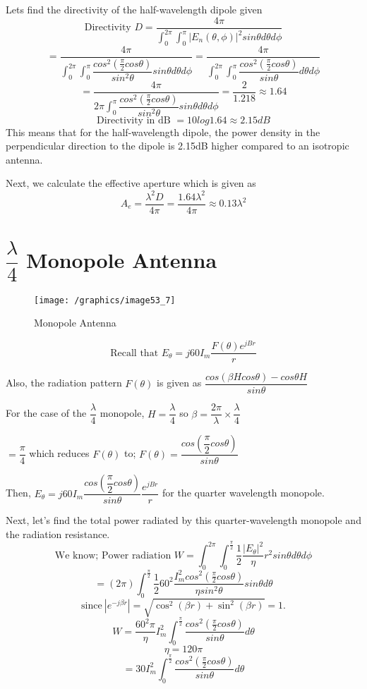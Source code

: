 Lets find the directivity of the half-wavelength dipole given 
\[ \text{Directivity }D = \dfrac{4\pi}{\int_{0}^{2\pi}\int_{0}^{\pi}|E_n(\theta ,\phi)|^2sin\theta d\theta d\phi} \]
\[ = \dfrac{4\pi}{\int_{0}^{2\pi}\int_{0}^{\pi}\dfrac{cos^2(\frac{\pi}{2}cos\theta)}{sin^2\theta}sin\theta d\theta d\phi} = \dfrac{4\pi}{\int_{0}^{2\pi}\int_{0}^{\pi}\dfrac{cos^2(\frac{\pi}{2}cos\theta)}{sin\theta} d\theta d\phi} \]
\[ = \dfrac{4\pi}{2\pi\int_{0}^{\pi}\dfrac{cos^2(\frac{\pi}{2}cos\theta)}{sin^2\theta}sin\theta d\theta d\phi} = \dfrac{2}{1.218} \approx 1.64 \]
\[ \text{Directivity in dB } = 10log1.64 \approx 2.15dB \]
This means that for the half-wavelength dipole, the power density in the perpendicular direction to the dipole is 2.15dB higher compared to an isotropic antenna.

Next, we calculate the effective aperture which is given as 
\[A_e = \dfrac{\lambda^2 D}{4\pi} = \dfrac{1.64\lambda^2}{4\pi} \approx 0.13\lambda^2 \]

\section{$\dfrac{\lambda}{4}$ Monopole Antenna}
\begin{figure}[h]
\centering
\texttt{[image: /graphics/image53\_7]}
\caption{Monopole Antenna}
\label{fig:fig7}
\end{figure}
\begin{equation*}
\text{Recall that }E_\theta = j60I_m \frac{F(\theta)e^{jBr}}{r}
\end{equation*}
\begin{center}
Also, the radiation pattern $F(\theta)$ is given as $\dfrac{cos(\beta H cos\theta) - cos\theta H}{sin \theta}$

For the case of the $\dfrac{\lambda}{4}$ monopole, $H = \dfrac{\lambda}{4}$ so $\beta = \dfrac{2\pi}{\lambda} \times \dfrac{\lambda}{4}$

$ = \dfrac{\pi}{4} $ which reduces $F(\theta)$ to; $F(\theta) = \dfrac{cos (\dfrac{\pi}{2} cos\theta)}{sin\theta}$

Then, $E_\theta = j60I_m \dfrac{cos (\dfrac{\pi}{2} cos\theta)}{sin\theta} \dfrac{e^{jBr}}{r}$ for the quarter wavelength monopole.
\end{center}
Next, let's find the total power radiated by this quarter-wavelength monopole and the radiation resistance. 
\[ \text{We know; Power radiation } W = \int_0^{2\pi}\int_{0}^{\frac{\pi}{2}} \frac{1}{2}\frac{|E_\theta|^2}{\eta}r^2sin\theta d\theta d\phi \]
\[ = (2\pi)\int_{0}^{\frac{\pi}{2}} \frac{1}{2} 60^2 \frac{I_m^2cos^2(\frac{\pi}{2}cos\theta)}{\eta sin^2\theta}sin\theta d\theta \]
$$\text{since}\ |e^{-j\beta r}| = \sqrt{\cos^2(\beta r) + \sin^2(\beta r)} = 1.$$
\[ W = \frac{60^2\pi}{\eta} I_m^2 \int_{0}^{\frac{\pi}{2}} \frac{cos^2(\frac{\pi}{2}cos\theta)}{sin\theta}d\theta \]
\[ \eta = 120\pi \]
\[ = 30I_m^2 \int_{0}^{\frac{\pi}{2}}\dfrac{cos^2(\frac{\pi}{2}cos\theta)}{sin\theta}d\theta \]

